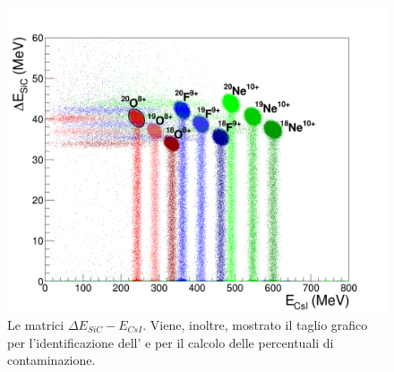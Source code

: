 
\begin{figure} [!p]
	\centering
	\includegraphics[width=\textwidth, keepaspectratio]{Grafici_Tesi2/PID/deltaE_Ecsi_quadrata_taglio_label.png}
	\caption{Le matrici $\Delta E_{SiC} - E_{CsI}$. Viene, inoltre, mostrato il taglio grafico per l'identificazione dell' e per il calcolo delle percentuali di contaminazione.} \label{fig:deltaE_Ecsi}
\end{figure}

